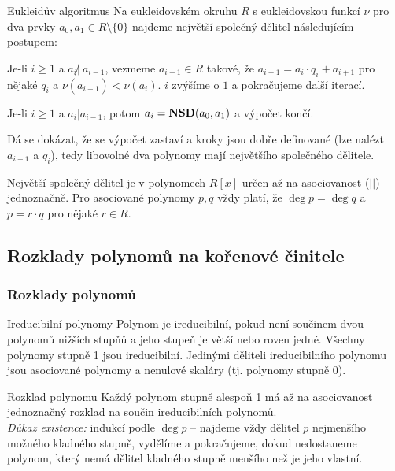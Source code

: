\begin{algoritmusN}{Eukleidův algoritmus}
Na eukleidovském okruhu $R$ s eukleidovskou funkcí $\nu$ pro dva prvky $a_0,a_1\in R\setminus\{0\}$ najdeme největší společný dělitel následujícím postupem:
\begin{pitemize}
    \item Je-li $i\geq 1$ a $a_i\not |\ a_{i-1}$, vezmeme $a_{i+1}\in R$ takové, že $a_{i-1}=a_i\cdot q_i+a_{i+1}$ pro nějaké $q_i$ a $\nu(a_{i+1})<\nu(a_i)$. $i$ zvýšíme o $1$ a pokračujeme další iterací.
    \item Je-li $i\geq 1$ a $a_i|a_{i-1}$, potom $a_i = \mathbf{NSD}(a_0,a_1)$ a výpočet končí.
\end{pitemize}
Dá se dokázat, že se výpočet zastaví a kroky jsou dobře definované (lze nalézt $a_{i+1}$ a $q_i$), tedy libovolné dva polynomy mají největšího společného dělitele.
\end{algoritmusN}

\begin{poznamka}
Největší společný dělitel je v polynomech $R[x]$ určen až na asociovanost ($||$) jednoznačně. Pro asociované polynomy $p,q$ vždy platí, že $\deg p=\deg q$ a $p=r\cdot q$ pro nějaké $r\in R$.
\end{poznamka}


\subsection{Rozklady polynomů na kořenové činitele}

\subsubsection*{Rozklady polynomů}

\begin{poznamkaN}{Ireducibilní polynomy}
Polynom je ireducibilní, pokud není součinem dvou polynomů nižších stupňů a jeho stupeň je větší nebo roven jedné. Všechny polynomy stupně 1 jsou ireducibilní. Jedinými děliteli ireducibilního polynomu jsou asociované polynomy a nenulové skaláry (tj. polynomy stupně 0).
\end{poznamkaN}


\begin{vetaN}{Rozklad polynomu}
Každý polynom stupně alespoň 1 má až na asociovanost jednoznačný rozklad na součin ireducibilních polynomů. \\\textit{Důkaz existence:} indukcí podle $\deg p$ -- najdeme vždy dělitel $p$ nejmenšího možného kladného stupně, vydělíme a pokračujeme, dokud nedostaneme polynom, který nemá dělitel kladného stupně menšího než je jeho vlastní.
\end{vetaN}


